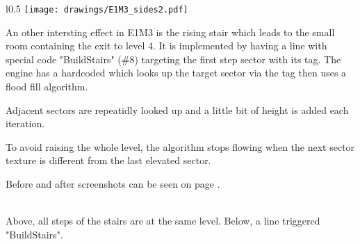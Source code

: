\par
\begin{wrapfigure}[22]{l}{0.5\textwidth}
\centering
\texttt{[image: drawings/E1M3\_sides2.pdf]}
\end{wrapfigure}
An other intersting effect in E1M3 is the rising stair which leads to the small room containing the exit to level 4. It is implemented by having a line with special code "BuildStairs" (\#8) targeting the first step sector with its tag. The engine has a hardcoded  which looks up the target sector via the tag then uses a flood fill algorithm.\\
\par Adjacent sectors are repeatidly looked up and a little bit of height is added each iteration.\\
\par To avoid raising the whole level, the algorithm stops flowing when the next sector texture is different from the last elevated sector.\\
\par
Before and after screenshots can be seen on page \pageref{stairs}.


\par
{}


\\

Above, all steps of the stairs are at the same level. Below, a line triggered "BuildStairs". \label{stairs}

\vspace{2mm}













\pagebreak
